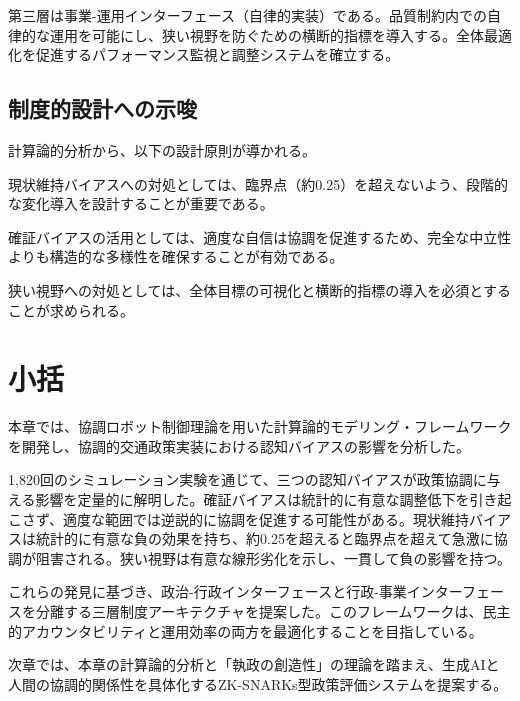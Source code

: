 第三層は事業-運用インターフェース（自律的実装）である。品質制約内での自律的な運用を可能にし、狭い視野を防ぐための横断的指標を導入する。全体最適化を促進するパフォーマンス監視と調整システムを確立する。

\subsection{制度的設計への示唆}

計算論的分析から、以下の設計原則が導かれる。

現状維持バイアスへの対処としては、臨界点（約0.25）を超えないよう、段階的な変化導入を設計することが重要である。

確証バイアスの活用としては、適度な自信は協調を促進するため、完全な中立性よりも構造的な多様性を確保することが有効である。

狭い視野への対処としては、全体目標の可視化と横断的指標の導入を必須とすることが求められる。

\section{小括}
\label{sec:ch4_summary}

本章では、協調ロボット制御理論を用いた計算論的モデリング・フレームワークを開発し、協調的交通政策実装における認知バイアスの影響を分析した。

1,820回のシミュレーション実験を通じて、三つの認知バイアスが政策協調に与える影響を定量的に解明した。確証バイアスは統計的に有意な調整低下を引き起こさず、適度な範囲では逆説的に協調を促進する可能性がある。現状維持バイアスは統計的に有意な負の効果を持ち、約0.25を超えると臨界点を超えて急激に協調が阻害される。狭い視野は有意な線形劣化を示し、一貫して負の影響を持つ。

これらの発見に基づき、政治-行政インターフェースと行政-事業インターフェースを分離する三層制度アーキテクチャを提案した。このフレームワークは、民主的アカウンタビリティと運用効率の両方を最適化することを目指している。

次章では、本章の計算論的分析と「執政の創造性」の理論を踏まえ、生成AIと人間の協調的関係性を具体化するZK-SNARKs型政策評価システムを提案する。



\printbibliography[heading=subbibliography,title={章末参考文献}]
